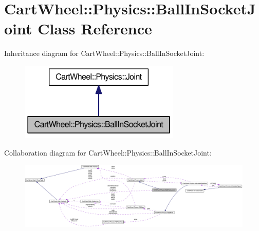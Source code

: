 \hypertarget{classCartWheel_1_1Physics_1_1BallInSocketJoint}{
\section{CartWheel::Physics::BallInSocketJoint Class Reference}
\label{classCartWheel_1_1Physics_1_1BallInSocketJoint}
}


Inheritance diagram for CartWheel::Physics::BallInSocketJoint:\nopagebreak
\begin{figure}[H]
\begin{center}
\leavevmode
\includegraphics[width=216pt]{classCartWheel_1_1Physics_1_1BallInSocketJoint__inherit__graph}
\end{center}
\end{figure}


Collaboration diagram for CartWheel::Physics::BallInSocketJoint:\nopagebreak
\begin{figure}[H]
\begin{center}
\leavevmode
\includegraphics[width=400pt]{classCartWheel_1_1Physics_1_1BallInSocketJoint__coll__graph}
\end{center}
\end{figure}
